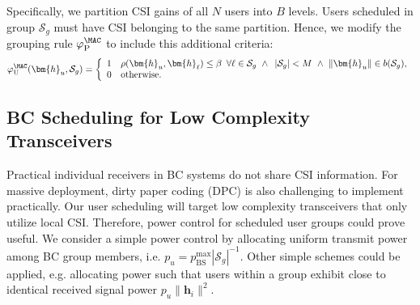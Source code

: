 Specifically, we partition CSI gains of all $N$ users into $B$ levels.
Users scheduled in group $\mathcal{S}_g$ must have CSI belonging to the same partition.
Hence, we modify the grouping rule $\varphi_{\mathrm{P}}^{\MAC}$ to include this additional criteria: 
\begin{align}
	\varphi_{\mathrm{U}}^{\MAC}(\bm{h}_u,\mathcal{S}_g)=\left\{\begin{array}{ll}1&
		\rho(\bm{h}_u,\bm{h}_{\ell})\leq\beta\,\,\,\forall \ell\in\mathcal{S}_g
		\,\,\wedge\,\,\, |\mathcal{S}_g|<M
		\,\,\wedge\,\,\|\bm{h}_u\|\in b(\mathcal{S}_g),\\0&\text{otherwise.}\end{array}\right.
	\label{usch:eqn:assignment_rule_mac}
\end{align}

\subsection{BC Scheduling for Low Complexity Transceivers} 

Practical individual receivers in BC systems do not share CSI information.
For massive deployment, dirty paper coding (DPC) \cite{jindal2005dirty} is also challenging to
implement practically.  Our user scheduling will target low complexity
transceivers that only utilize local CSI. Therefore, power control for scheduled user
groups could prove useful. We consider a simple power control by allocating
uniform transmit power among BC group members, i.e. $p_u=p_{\mathrm{BS}}^{\mathrm{max}}|\mathcal{S}_g|^{-1}$. 
Other simple schemes could be applied, e.g. allocating power such that users within a group exhibit close to identical received signal power $p_u\|\bm{h}_i\|^2$.



